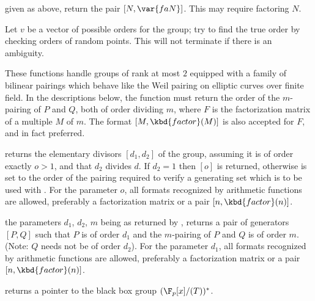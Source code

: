  given  as above,
return the pair $[N, \var{faN}]$. This may require factoring $N$.

Let $v$ be a vector of possible orders for the group; try to find the true
order by checking orders of random points. This will not terminate if there
is an ambiguity.


These functions handle groups of rank at most $2$ equipped with a family of
bilinear pairings which behave like the Weil pairing on elliptic curves over
finite field. In the descriptions below, the function  must return the order of the $m$-pairing of $P$ and $Q$, both of order
dividing $m$, where $F$ is the factorization matrix of a multiple $M$ of $m$.
The format $[M, \kbd{factor}(M)]$ is also accepted for $F$, and in fact
preferred.

returns the elementary divisors $[d_1, d_2]$ of the group, assuming it is of
order exactly $o>1$, and that $d_2$ divides $d$. If $d_2=1$ then $[o]$ is
returned, otherwise  is set to the order of the pairing
required to verify a generating set which is to be used with
. For the parameter $o$, all formats recognized by
arithmetic functions are allowed, preferably a factorization matrix or a pair
$[n,\kbd{factor}(n)]$.

the parameters $d_1$, $d_2$, $m$ being as returned by ,
returns a pair of generators $[P,Q]$ such that $P$ is of order $d_1$ and the
$m$-pairing of $P$ and $Q$ is of order $m$. (Note: $Q$ needs not be of order
$d_2$). For the parameter $d_1$, all formats recognized by arithmetic
functions are allowed, preferably a factorization matrix or a pair
$[n,\kbd{factor}(n)]$.



returns a pointer to the black box group $(\F_p[x]/(T))^*$.

